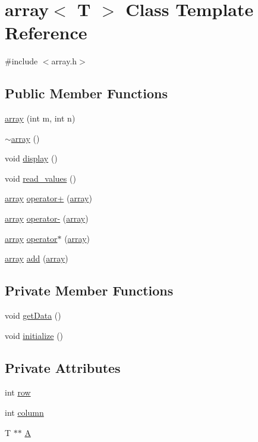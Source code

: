 \hypertarget{classarray}{}\section{array$<$ T $>$ Class Template Reference}
\label{classarray}


{\ttfamily \#include $<$array.\+h$>$}

\subsection*{Public Member Functions}
\begin{DoxyCompactItemize}
\item 
\hyperlink{classarray_a090e68e6f659a8c24a3046d3b57617f7}{array} (int m, int n)
\item 
\hyperlink{classarray_a5a5249a0715f8e7e5422fb66f0f663f8}{$\sim$array} ()
\item 
void \hyperlink{classarray_ac6ac82ef5fecc273bd8f2d67b449c5ed}{display} ()
\item 
void \hyperlink{classarray_a010a4dd12776af094c33b8ae107c0ee9}{read\+\_\+values} ()
\item 
\hyperlink{classarray}{array} \hyperlink{classarray_ac0bd5fcf5f53194e14159f1a26b578f6}{operator+} (\hyperlink{classarray}{array})
\item 
\hyperlink{classarray}{array} \hyperlink{classarray_a521b6f90168c5c949ba5d814aee981ed}{operator-\/} (\hyperlink{classarray}{array})
\item 
\hyperlink{classarray}{array} \hyperlink{classarray_aafcac5ad6b36e4a93323f0d757aab02e}{operator$\ast$} (\hyperlink{classarray}{array})
\item 
\hyperlink{classarray}{array} \hyperlink{classarray_a57199cc30628af328c2d7f72b0c7b3b1}{add} (\hyperlink{classarray}{array})
\end{DoxyCompactItemize}
\subsection*{Private Member Functions}
\begin{DoxyCompactItemize}
\item 
void \hyperlink{classarray_a190f65c46755585269c87b065194aefd}{get\+Data} ()
\item 
void \hyperlink{classarray_afcc7d2bd10460a423cc2384bfc4d479f}{initialize} ()
\end{DoxyCompactItemize}
\subsection*{Private Attributes}
\begin{DoxyCompactItemize}
\item 
int \hyperlink{classarray_a7c38a7c022fd545cbb1d4ff62522a231}{row}
\item 
int \hyperlink{classarray_a0722d2ae3a709aa8abadac67a3c0b003}{column}
\item 
T $\ast$$\ast$ \hyperlink{classarray_acaddf8a3372a3910c35ee4e15bce513e}{A}
\end{DoxyCompactItemize}



